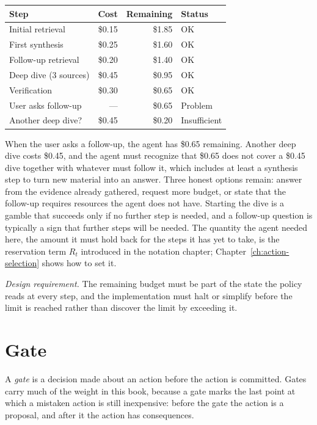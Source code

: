 \documentclass[11pt]{book}
\begin{document}
\begin{center}
\begin{tabular}{lrrl}
\toprule
Step & Cost & Remaining & Status \\
\midrule
Initial retrieval & \$0.15 & \$1.85 & OK \\
First synthesis & \$0.25 & \$1.60 & OK \\
Follow-up retrieval & \$0.20 & \$1.40 & OK \\
Deep dive (3 sources) & \$0.45 & \$0.95 & OK \\
Verification & \$0.30 & \$0.65 & OK \\
User asks follow-up & --- & \$0.65 & Problem \\
Another deep dive? & \$0.45 & \$0.20 & Insufficient \\
\bottomrule
\end{tabular}
\end{center}

When the user asks a follow-up, the agent has \$0.65 remaining. Another deep dive costs \$0.45, and the agent must recognize that \$0.65 does not cover a \$0.45 dive together with whatever must follow it, which includes at least a synthesis step to turn new material into an answer. Three honest options remain: answer from the evidence already gathered, request more budget, or state that the follow-up requires resources the agent does not have. Starting the dive is a gamble that succeeds only if no further step is needed, and a follow-up question is typically a sign that further steps will be needed. The quantity the agent needed here, the amount it must hold back for the steps it has yet to take, is the reservation term $R_t$ introduced in the notation chapter; Chapter~\ref{ch:action-selection} shows how to set it.

\textit{Design requirement.} The remaining budget must be part of the state the policy reads at every step, and the implementation must halt or simplify before the limit is reached rather than discover the limit by exceeding it.

\section{Gate}

A \emph{gate} is a decision made about an action before the action is committed. Gates carry much of the weight in this book, because a gate marks the last point at which a mistaken action is still inexpensive: before the gate the action is a proposal, and after it the action has consequences.
\end{document}
